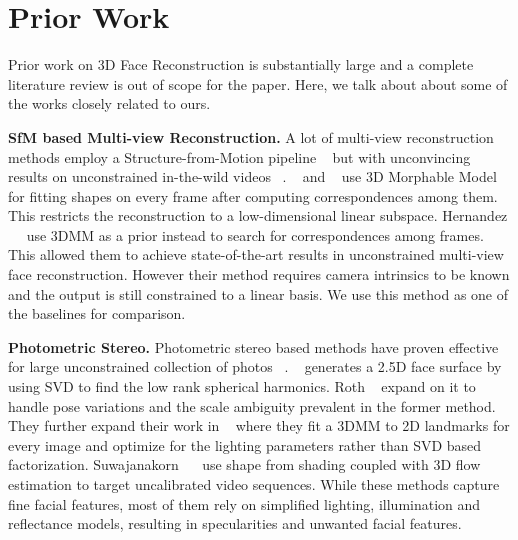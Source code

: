\documentclass[10pt,twocolumn,letterpaper]{article}
\begin{document}
\section{Prior Work}
Prior work on 3D Face Reconstruction is substantially large and a complete literature review is out of scope for the paper. Here, we talk about about some of the works closely related to ours.

\noindent \textbf{SfM based Multi-view Reconstruction.} A lot of multi-view reconstruction methods employ a Structure-from-Motion pipeline ~\cite{gotardo2015photogeometric, lin2010accurate, fidaleo2007model} but with unconvincing results on unconstrained in-the-wild videos ~\cite{hernandez2017accurate}. ~\cite{brand2001morphable} and ~\cite{shi2014automatic} use 3D Morphable Model~\cite{blanz1999morphable} for fitting shapes on every frame after computing correspondences among them. This restricts the reconstruction to a low-dimensional linear subspace. Hernandez ~\etal ~\cite{hernandez2017accurate} use 3DMM as a prior instead to search for correspondences among frames. This allowed them to achieve state-of-the-art results in unconstrained multi-view face reconstruction. However their method requires camera intrinsics to be known and the output is still constrained to a linear basis. We use this method as one of the baselines for comparison.

\noindent \textbf{Photometric Stereo.} Photometric stereo based methods have proven effective for large unconstrained collection of photos ~\cite{kemelmacher2011face, kemelmacher2013internet, roth2015unconstrained}. ~\cite{kemelmacher2011face} generates a 2.5D face surface by using SVD to find the low rank spherical harmonics. Roth \etal ~\cite{roth2015unconstrained} expand on it to handle pose variations and the scale ambiguity prevalent in the former method. They further expand their work in ~\cite{roth2016adaptive} where they fit a 3DMM to 2D landmarks for every image and optimize for the lighting parameters rather than SVD based factorization. Suwajanakorn ~\etal ~\cite{suwajanakorn2014total} use shape from shading coupled with 3D flow estimation to target uncalibrated video sequences. While these methods capture fine facial features, most of them rely on simplified lighting, illumination and reflectance models, resulting in specularities and unwanted facial features.
\end{document}
